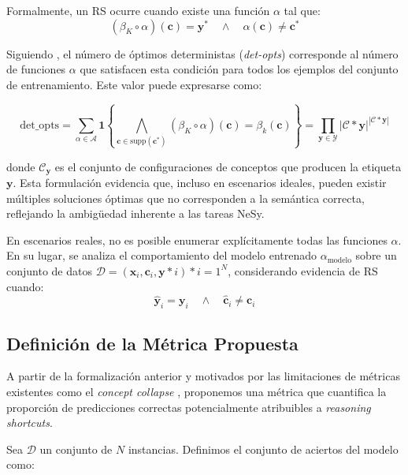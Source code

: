 \documentclass[12pt]{article}
\begin{document}
Formalmente, un RS ocurre cuando existe una función $\alpha$ tal que:
\begin{equation*}
(\beta_K \circ \alpha)(\mathbf{c}) = \mathbf{y}^* \quad \wedge \quad \alpha(\mathbf{c}) \neq \mathbf{c}^*
\end{equation*}

Siguiendo \cite{Marconato2023-NotAll}, el número de óptimos deterministas (\textit{det-opts}) corresponde al número de funciones $\alpha$ que satisfacen esta condición para todos los ejemplos del conjunto de entrenamiento. Este valor puede expresarse como:

\begin{equation}
\text{det\_opts} = \sum_{\alpha\in\mathcal{A}} \mathbf{1}\left\{\bigwedge_{\mathbf{c}\in \text{supp}(\mathbf{c^*})}(\beta_K \circ \alpha)(\mathbf{c}) = \beta_k(\mathbf{c})\right\} = \prod_{\mathbf{y} \in \mathcal{Y}} |\mathcal{C}*{\mathbf{y}}|^{|\mathcal{C}*{\mathbf{y}}|}
\end{equation}

donde $\mathcal{C}_{\mathbf{y}}$ es el conjunto de configuraciones de conceptos que producen la etiqueta $\mathbf{y}$. Esta formulación evidencia que, incluso en escenarios ideales, pueden existir múltiples soluciones óptimas que no corresponden a la semántica correcta, reflejando la ambigüedad inherente a las tareas NeSy.

En escenarios reales, no es posible enumerar explícitamente todas las funciones $\alpha$. En su lugar, se analiza el comportamiento del modelo entrenado $\alpha_{\text{modelo}}$ sobre un conjunto de datos $\mathcal{D} = {(\mathbf{x}_i, \mathbf{c}_i, \mathbf{y}*i)}*{i=1}^N$, considerando evidencia de RS cuando:
\begin{equation}
\hat{\mathbf{y}}_i = \mathbf{y}_i \quad \wedge \quad \hat{\mathbf{c}}_i \neq \mathbf{c}_i
\end{equation}

\subsection{Definición de la Métrica Propuesta}

A partir de la formalización anterior y motivados por las limitaciones de métricas existentes como el \textit{concept collapse} \cite{Bortolotti2024}, proponemos una métrica que cuantifica la proporción de predicciones correctas potencialmente atribuibles a \textit{reasoning shortcuts}.

Sea $\mathcal{D}$ un conjunto de $N$ instancias. Definimos el conjunto de aciertos del modelo como:
\end{document}
